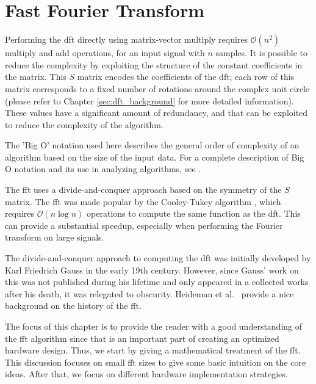 
\chapter{Fast Fourier Transform}
\glsresetall
\label{chapter:fft}

Performing the \gls{dft} directly using matrix-vector multiply requires $\mathcal{O}(n^2)$ multiply and add operations, for an input signal with $n$ samples.  It is possible to reduce the complexity by exploiting the structure of the constant coefficients in the matrix.  This $S$ matrix encodes the coefficients of the \gls{dft}; each row of this matrix corresponds to a fixed number of rotations around the complex unit circle (please refer to Chapter \ref{sec:dft_background} for more detailed information). These values have a significant amount of redundancy, and that can be exploited to reduce the complexity of the algorithm. 

\begin{aside}
The 'Big O' notation used here describes the general order of complexity of an algorithm based on the size of the input data.  For a complete description of Big O notation and its use in analyzing algorithms, see \cite{CLR}.
\end{aside}

The \gls{fft} uses a divide-and-conquer approach based on the symmetry of the $S$ matrix.  The \gls{fft} was made popular by the Cooley-Tukey algorithm \cite{cooley65}, which requires $\mathcal{O}(n \log n)$ operations to compute the same function as the \gls{dft}.  This can provide a substantial speedup, especially when performing the Fourier transform on large signals. %

\begin{aside}
The divide-and-conquer approach to computing the \gls{dft} was initially developed by Karl Friedrich Gauss in the early 19th century. However, since Gauss' work on this was not published during his lifetime and only appeared in a collected works after his death, it was relegated to obscurity.  Heideman et al.~\cite{heideman84} provide a nice background on the history of the \gls{fft}.
\end{aside}

The focus of this chapter is to provide the reader with a good understanding of the \gls{fft} algorithm since that is an important part of creating an optimized hardware design. Thus, we start by giving a mathematical treatment of the \gls{fft}. This discussion focuses on small \gls{fft} sizes to give some basic intuition on the core ideas. After that, we focus on different hardware implementation strategies.

